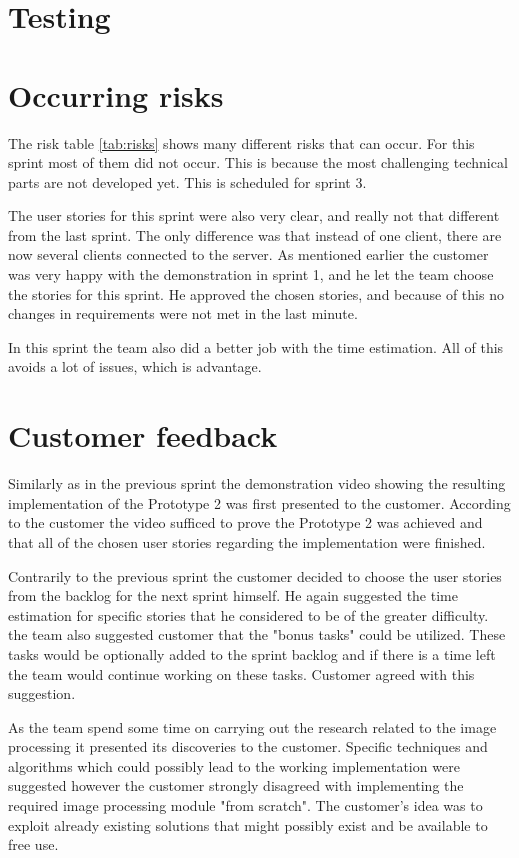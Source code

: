 \section{Testing}
\section{Occurring risks}

The risk table \ref{tab:risks} shows many different risks that can occur. 
For this sprint most of them did not occur. 
This is because the most challenging technical parts are not developed yet. 
This is scheduled for sprint 3. 

The user stories for this sprint were also very clear, and really not that different from the last sprint. 
The only difference was that instead of one client, there are now several clients connected to the server. 
As mentioned earlier the customer was very happy with the demonstration in sprint 1, and he let the team choose the stories for this sprint. 
He approved the chosen stories, and because of this no changes in requirements were not met in the last minute.
 
In this sprint the team also did a better job with the time estimation. 
All of this avoids a lot of issues, which is advantage. 
  
\section{Customer feedback}
Similarly as in the previous sprint the demonstration video showing the resulting implementation of the Prototype 2 was first presented to the customer. According to the customer the video sufficed to prove the Prototype 2 was achieved and that all of the chosen user stories regarding the implementation were finished.

Contrarily to the previous sprint the customer decided to choose the user stories from the backlog for the next sprint himself. He again suggested the time estimation for specific stories that he considered to be of the greater difficulty. the team also suggested customer that the "bonus tasks" could be utilized. These tasks would be optionally added to the sprint backlog and if there is a time left the team would continue working on these tasks. Customer agreed with this suggestion.

As the team spend some time on carrying out the research related to the image processing it presented its discoveries to the customer. Specific techniques and algorithms which could possibly lead to the working implementation were suggested however the customer strongly disagreed with implementing the required image processing module "from scratch". The customer's idea was to exploit already existing solutions that might possibly exist and be available to free use.

